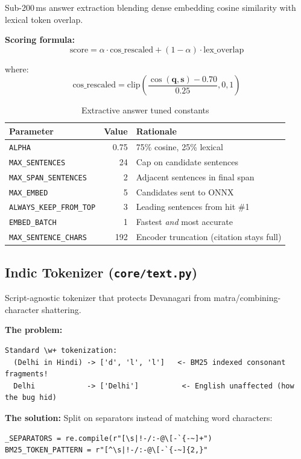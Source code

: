 \documentclass[12pt,a4paper]{article}
\begin{document}
Sub-200\,ms answer extraction blending dense embedding cosine similarity with lexical token overlap.

\textbf{Scoring formula:}
$$\text{score} = \alpha \cdot \text{cos\_rescaled} + (1 - \alpha) \cdot \text{lex\_overlap}$$

where:
$$\text{cos\_rescaled} = \text{clip}\left(\frac{\cos(\mathbf{q}, \mathbf{s}) - 0.70}{0.25}, 0, 1\right)$$

\begin{table}[H]
\centering
\begin{tabular}{lrl}
\toprule
\textbf{Parameter} & \textbf{Value} & \textbf{Rationale} \\
\midrule
\texttt{ALPHA}                    & 0.75 & 75\% cosine, 25\% lexical \\
\texttt{MAX\_SENTENCES}           & 24   & Cap on candidate sentences \\
\texttt{MAX\_SPAN\_SENTENCES}     & 2    & Adjacent sentences in final span \\
\texttt{MAX\_EMBED}               & 5    & Candidates sent to ONNX \\
\texttt{ALWAYS\_KEEP\_FROM\_TOP}  & 3    & Leading sentences from hit \#1 \\
\texttt{EMBED\_BATCH}             & 1    & Fastest \textit{and} most accurate \\
\texttt{MAX\_SENTENCE\_CHARS}     & 192  & Encoder truncation (citation stays full) \\
\bottomrule
\end{tabular}
\caption{Extractive answer tuned constants}
\end{table}


\subsection{Indic Tokenizer (\texttt{core/text.py})}

Script-agnostic tokenizer that protects Devanagari from matra/combining-character shattering.

\textbf{The problem:}
\begin{lstlisting}[style=bashstyle, language={}]
Standard \w+ tokenization:
  (Delhi in Hindi) -> ['d', 'l', 'l']   <- BM25 indexed consonant fragments!
  Delhi            -> ['Delhi']          <- English unaffected (how the bug hid)
\end{lstlisting}

\textbf{The solution:} Split on separators instead of matching word characters:
\begin{lstlisting}
_SEPARATORS = re.compile(r"[\s|!-/:-@\[-`{-~]+")
BM25_TOKEN_PATTERN = r"[^\s|!-/:-@\[-`{-~]{2,}"
\end{lstlisting}
\end{document}
